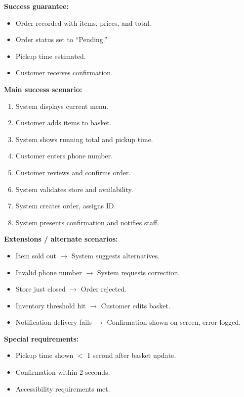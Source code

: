 \documentclass{article}
\begin{document}
\textbf{Success guarantee:}
\begin{itemize}
    \item Order recorded with items, prices, and total.
    \item Order status set to ``Pending.''
    \item Pickup time estimated.
    \item Customer receives confirmation.
\end{itemize}

\textbf{Main success scenario:}
\begin{enumerate}
    \item System displays current menu.
    \item Customer adds items to basket.
    \item System shows running total and pickup time.
    \item Customer enters phone number.
    \item Customer reviews and confirms order.
    \item System validates store and availability.
    \item System creates order, assigns ID.
    \item System presents confirmation and notifies staff.
\end{enumerate}

\textbf{Extensions / alternate scenarios:}
\begin{itemize}
    \item Item sold out $\rightarrow$ System suggests alternatives.
    \item Invalid phone number $\rightarrow$ System requests correction.
    \item Store just closed $\rightarrow$ Order rejected.
    \item Inventory threshold hit $\rightarrow$ Customer edits basket.
    \item Notification delivery fails $\rightarrow$ Confirmation shown on screen, error logged.
\end{itemize}

\textbf{Special requirements:}
\begin{itemize}
    \item Pickup time shown $<$ 1 second after basket update.
    \item Confirmation within 2 seconds.
    \item Accessibility requirements met.
\end{itemize}
\end{document}
